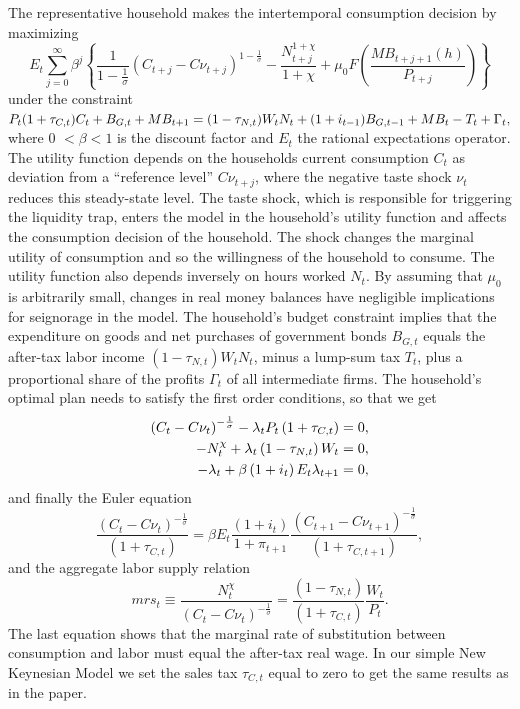 The representative household makes the intertemporal consumption decision by maximizing
\begin{equation}
E_t \sum_{j=0}^\infty \beta^j \left\{ \frac{1}{1- \frac{1}{\sigma}} \left(C_{t+j} - C\nu_{t+j}\right)^{1-\frac{1}{\sigma}} - \frac{N_{t+j}^{1+\chi}}{1+\chi} + \mu_0F \left(\frac{MB_{t+j+1}(h)}{P_{t+j}}\right)\right\} \nonumber
\end{equation}
under the constraint\newline
$P_t(1+\tau_{C,t})C_t + B_{G,t} + MB_{t+1} = (1-\tau_{N,t})W_tN_t + (1+i_{t-1})B_{G,t-1} + MB_t - T_t + \Gamma_t, \vspace{0.2cm}$
where 0 $< \beta < 1$ is the discount factor and $E_t$ the rational expectations operator. The utility function depends on the households current consumption $C_t$ as deviation from a “reference level” $C\nu_{t+j}$, where the negative taste shock $\nu_t$ reduces this steady-state level. The taste shock, which is responsible for triggering the liquidity trap, enters the model in the household's utility function and affects the consumption decision of the household. The shock changes the marginal utility of consumption and so the willingness of the household to consume.\newline
The utility function also depends inversely on hours worked $N_t$. By assuming that $\mu_0$ is arbitrarily small, changes in real money balances have negligible implications for seignorage in the model. The household's budget constraint implies that the expenditure on goods and net purchases of government bonds $B_{G,t}$ equals the after-tax labor income $ \left(1 - \tau_{N,t} \right) W_tN_t$, minus a lump-sum tax $T_t$, plus a proportional share of the profits $\Gamma_t$ of all intermediate firms. The household's optimal plan needs to satisfy the first order conditions, so that we get
\begin{align}
\vspace{-0.5cm} \left(C_t - C\nu_t\right)^{-\frac{1}{\sigma}}  - \lambda_tP_t \left(1 + \tau_{C,t} \right) = 0,\nonumber\\
-N_t^{\chi} + \lambda_t \left(1 - \tau_{N,t} \right) W_t = 0,\nonumber\\
-\lambda_t + \beta \left(1 + i_t \right) E_t\lambda_{t+1} = 0,\nonumber
\end{align}
and finally the Euler equation
\begin{equation}
\frac {\left(C_t - C\nu_t\right)^{-\frac{1}{\sigma}}}{\left(1 + \tau_{C,t} \right)} = \beta E_t \frac{\left(1 + i_t \right)}{1 + \pi_{t+1}} \frac{\left(C_{t+1} - C\nu_{t+1}\right)^{-\frac{1}{\sigma}}}{\left(1+ \tau_{C,t+1}\right)},
\end{equation}
and the aggregate labor supply relation
\begin{equation}
mrs_t \equiv \frac{N_t^\chi}{\left(C_t - C\nu_t\right)^{-\frac{1}{\sigma}}} = \frac{\left(1 - \tau_{N,t}\right)}{\left(1 + \tau_{C,t}\right)} \frac{W_t}{P_t}.
\end{equation}
The last equation shows that the marginal rate of substitution between consumption and labor must equal the after-tax real wage. In our simple New Keynesian Model we set the sales tax $\tau_{C,t}$ equal to zero to get the same results as in the paper.

